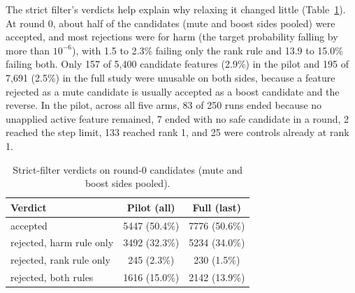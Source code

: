 \documentclass[conference]{IEEEtran}
\begin{document}
The strict filter's verdicts help explain why relaxing it changed little (Table~\ref{tab:reasons}). At round 0, about half of the candidates (mute and boost sides pooled) were accepted, and most rejections were for harm (the target probability falling by more than $10^{-6}$), with 1.5 to 2.3\% failing only the rank rule and 13.9 to 15.0\% failing both. Only 157 of 5,400 candidate features (2.9\%) in the pilot and 195 of 7,691 (2.5\%) in the full study were unusable on both sides, because a feature rejected as a mute candidate is usually accepted as a boost candidate and the reverse. In the pilot, across all five arms, 83 of 250 runs ended because no unapplied active feature remained, 7 ended with no safe candidate in a round, 2 reached the step limit, 133 reached rank 1, and 25 were controls already at rank 1.

\begin{table}[t]
\caption{Strict-filter verdicts on round-0 candidates (mute and boost sides pooled).}
\label{tab:reasons}
\centering\footnotesize
\begin{tabular}{@{}lcc@{}}
\toprule
Verdict & Pilot (all) & Full (last)\\
\midrule
accepted & 5447 (50.4\%) & 7776 (50.6\%)\\
rejected, harm rule only & 3492 (32.3\%) & 5234 (34.0\%)\\
rejected, rank rule only & 245 (2.3\%) & 230 (1.5\%)\\
rejected, both rules & 1616 (15.0\%) & 2142 (13.9\%)\\
\bottomrule
\end{tabular}
\end{table}
\end{document}
